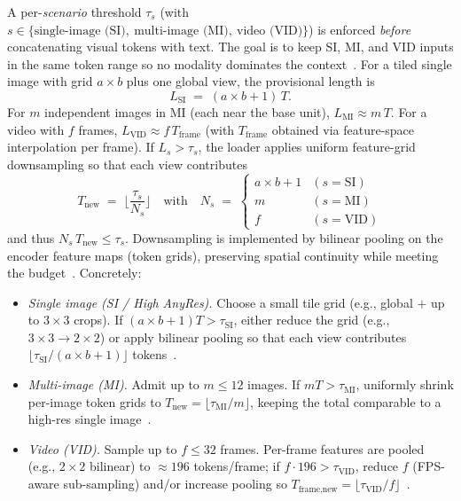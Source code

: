 \begin{enrichment}
\begin{enrichment}
\begin{itemize}
            A per-\emph{scenario} threshold $\tau_s$ (with $s\!\in\!\{\text{single-image (SI)},\ \text{multi-image (MI)},\ \text{video (VID)}\}$) is enforced \emph{before} concatenating visual tokens with text. The goal is to keep SI, MI, and VID inputs in the same token range so no modality dominates the context~\cite{li2024_llavaonevision}. For a tiled single image with grid $a{\times}b$ plus one global view, the provisional length is
            \[
            L_{\text{SI}} \;=\; (a{\times}b + 1)\,T.
            \]
            For $m$ independent images in MI (each near the base unit), $L_{\text{MI}} \!\approx\! m\,T$. For a video with $f$ frames, $L_{\text{VID}} \!\approx\! f\,T_{\text{frame}}$ (with $T_{\text{frame}}$ obtained via feature-space interpolation per frame). If $L_s \!>\! \tau_s$, the loader applies uniform feature-grid downsampling so that each view contributes
            \[
            T_{\text{new}} \;=\; \Big\lfloor \frac{\tau_s}{N_s} \Big\rfloor
            \quad\text{with}\quad
            N_s \;=\;
            \begin{cases}
                a{\times}b+1 & (s=\text{SI})\\
                m & (s=\text{MI})\\
                f & (s=\text{VID})
            \end{cases}
            \]
            and thus $N_s\,T_{\text{new}} \le \tau_s$. Downsampling is implemented by bilinear pooling on the encoder feature maps (token grids), preserving spatial continuity while meeting the budget~\cite{li2024_llavaonevision}. Concretely:
            
            \begin{itemize}
                \item \emph{Single image (SI / High AnyRes).} Choose a small tile grid (e.g., global $+$ up to $3{\times}3$ crops). If $(a{\times}b{+}1)T \!>\! \tau_{\text{SI}}$, either reduce the grid (e.g., $3{\times}3\!\to\!2{\times}2$) or apply bilinear pooling so that each view contributes $\lfloor \tau_{\text{SI}}/(a{\times}b{+}1)\rfloor$ tokens~\cite{li2024_llavaonevision}.
                \item \emph{Multi-image (MI).} Admit up to $m{\le}12$ images. If $mT \!>\! \tau_{\text{MI}}$, uniformly shrink per-image token grids to $T_{\text{new}}\!=\!\lfloor \tau_{\text{MI}}/m\rfloor$, keeping the total comparable to a high-res single image~\cite{li2024_llavaonevision}.
                \item \emph{Video (VID).} Sample up to $f{\le}32$ frames. Per-frame features are pooled (e.g., $2{\times}2$ bilinear) to $\approx\!196$ tokens/frame; if $f\cdot 196 \!>\! \tau_{\text{VID}}$, reduce $f$ (FPS-aware sub-sampling) and/or increase pooling so $T_{\text{frame,new}}\!=\!\lfloor \tau_{\text{VID}}/f\rfloor$~\cite{li2024_llavaonevision}.
            \end{itemize}
            

\end{itemize}
\end{enrichment}
\end{enrichment}
